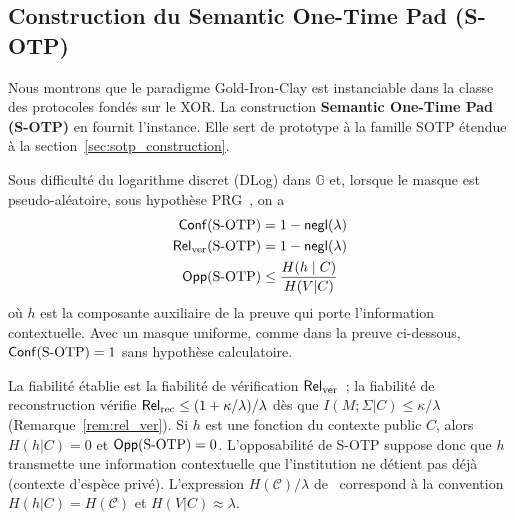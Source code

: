 \subsection{Construction du Semantic One-Time Pad (S-OTP)}
\label{subsec:construction_sotp}
\begin{sloppypar}
Nous montrons que le paradigme Gold-Iron-Clay est instanciable
dans la classe des protocoles fond\'es sur le XOR. La construction
\textbf{Semantic One-Time Pad (S-OTP)} en fournit l'instance. Elle sert de prototype
\`a la famille SOTP \'etendue \`a la section~\ref{sec:sotp_construction}.

\begin{theorem}\label{thm:proprietes_sotp}
Sous difficult\'e du logarithme discret (DLog) dans $\mathbb{G}$ et, lorsque le masque est
pseudo-al\'eatoire, sous hypoth\`ese PRG~\cite{BlumMicali84,Yao82}, on a
\begin{align}
\mathsf{Conf}(\text{S-OTP}) &= 1 - \mathsf{negl}(\lambda) \\
\mathsf{Rel}_{\mathrm{ver}}(\text{S-OTP}) &= 1 - \mathsf{negl}(\lambda) \\
\mathsf{Opp}(\text{S-OTP}) &\leq \frac{H(h \mid C)}{H(V|C)}
\end{align}
o\`u $h$ est la composante auxiliaire de la preuve qui porte l'information
contextuelle. Avec un masque uniforme, comme dans la preuve ci-dessous, $\mathsf{Conf}(\text{S-OTP}) = 1$
sans hypoth\`ese calculatoire.
\end{theorem}

\begin{remark}\label{rem:portee_sotp}
La fiabilit\'e \'etablie est la fiabilit\'e de v\'erification $\mathsf{Rel}_{\mathrm{ver}}$~; la
fiabilit\'e de reconstruction v\'erifie $\mathsf{Rel}_{\mathrm{rec}} \leq (1+\kappa/\lambda)/\lambda$
d\`es que $I(M;\Sigma|C) \leq \kappa/\lambda$ (Remarque~\ref{rem:rel_ver}). Si $h$ est
une fonction du contexte public $C$, alors $H(h|C) = 0$ et $\mathsf{Opp}(\text{S-OTP}) = 0$.
L'opposabilit\'e de S-OTP suppose donc que $h$ transmette une information
contextuelle que l'institution ne d\'etient pas d\'ej\`a (contexte d'esp\`ece
priv\'e). L'expression $H(\mathcal{C})/\lambda$ de~\cite{MINKA2026CLO} correspond \`a la
convention $H(h|C) = H(\mathcal{C})$ et $H(V|C) \approx \lambda$.
\end{remark}

\begin{Preuve}\label{prv:sotp_conf}


\end{Preuve}
\end{sloppypar}

